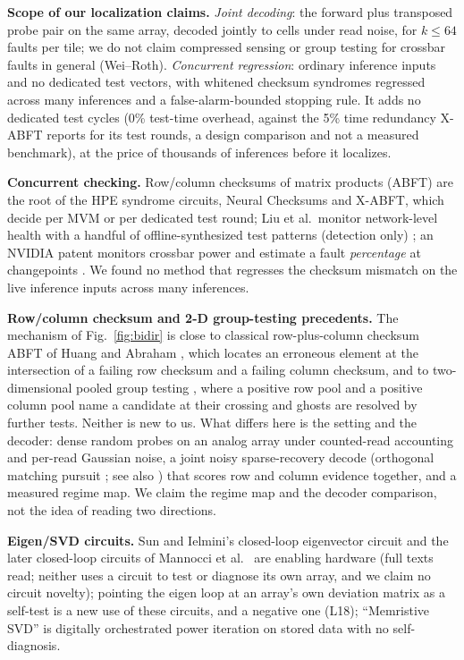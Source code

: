 \documentclass[journal]{IEEEtran}
\begin{document}
\textbf{Scope of our localization claims.} \emph{Joint decoding}: the forward plus transposed probe pair on the same array, decoded jointly to cells under read noise, for $k\le64$ faults per tile; we do not claim compressed sensing or group testing for crossbar faults in general (Wei--Roth). \emph{Concurrent regression}: ordinary inference inputs and no dedicated test vectors, with whitened checksum syndromes regressed across many inferences and a false-alarm-bounded stopping rule. It adds no dedicated test cycles (0\% test-time overhead, against the 5\% time redundancy X-ABFT reports for its test rounds, a design comparison and not a measured benchmark), at the price of thousands of inferences before it localizes.

\textbf{Concurrent checking.} Row/column checksums of matrix products (ABFT) \cite{huang1984abft} are the root of the HPE syndrome circuits, Neural Checksums and X-ABFT, which decide per MVM or per dedicated test round; Liu et al.\ monitor network-level health with a handful of offline-synthesized test patterns (detection only) \cite{liu2020dac}; an NVIDIA patent monitors crossbar power and estimate a fault \emph{percentage} at changepoints \cite{nvidia11971790}. We found no method that regresses the checksum mismatch on the live inference inputs across many inferences.

\textbf{Row/column checksum and 2-D group-testing precedents.} The mechanism of Fig.~\ref{fig:bidir} is close to classical row-plus-column checksum ABFT of Huang and Abraham \cite{huang1984abft}, which locates an erroneous element at the intersection of a failing row checksum and a failing column checksum, and to two-dimensional pooled group testing \cite{aldridge2019gt}, where a positive row pool and a positive column pool name a candidate at their crossing and ghosts are resolved by further tests. Neither is new to us. What differs here is the setting and the decoder: dense random probes on an analog array under counted-read accounting and per-read Gaussian noise, a joint noisy sparse-recovery decode (orthogonal matching pursuit \cite{tropp2007omp}; see also \cite{donoho2006cs,candes2006robust}) that scores row and column evidence together, and a measured regime map. We claim the regime map and the decoder comparison, not the idea of reading two directions.

\textbf{Eigen/SVD circuits.} Sun and Ielmini's closed-loop eigenvector circuit \cite{sun2020eigen} and the later
closed-loop circuits of Mannocci et al.\ \cite{mannocci2024,mannocci2023block} are enabling hardware (full texts read; neither uses a circuit to test or diagnose its own array, and we claim no circuit novelty); pointing the eigen loop at an array's own deviation matrix as a self-test is a new use of these circuits, and a negative one (L18); ``Memristive SVD'' \cite{msvd2026}
is digitally orchestrated power iteration on stored data with no self-diagnosis.
\end{document}
